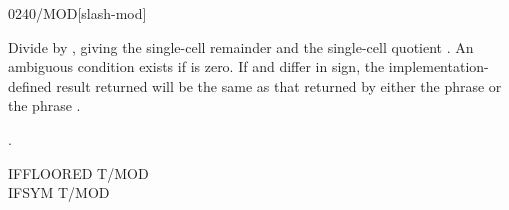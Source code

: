 \vspace*{-2ex}
\begin{worddef}{0240}{/MOD}[slash-mod]
\item {}

	Divide  by , giving the single-cell remainder
	 and the single-cell quotient . An ambiguous
	condition exists if  is zero. If  and
	 differ in sign, the implementation-defined result
	returned will be the same as that returned by either the phrase
	   
	or the phrase
	   .

\see {}.

	\begin{testing} %
		\ttfamily
		IFFLOORED \tab  \word{:} T/MOD      \word{;} \\
		IFSYM \tab[2.8] \word{:} T/MOD      \word{;}


\end{testing}
\end{worddef}

